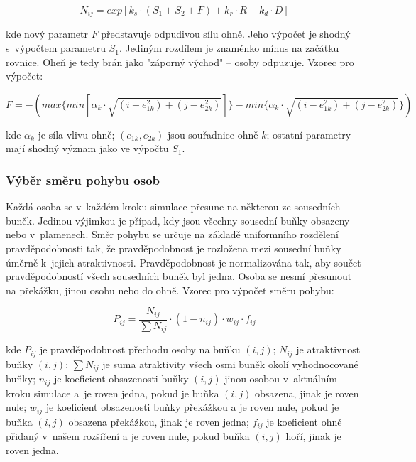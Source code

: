\documentclass[11pt, titlepage, a4paper]{article}
\begin{document}
        \begin{equation}
        \label{eq_NijExt}
        N_{ij} = exp[k_s \cdot (S_1 + S_2 + F) + k_r \cdot R + k_d \cdot D]
        \end{equation}

        kde nový parametr $F$ představuje odpudivou sílu ohně. Jeho výpočet je shodný s~výpočtem parametru $S_1$. Jediným rozdílem je znaménko mínus na začátku rovnice. Oheň je tedy brán jako "záporný východ" -- osoby odpuzuje. Vzorec pro výpočet:

        \begin{equation}
        \label{eq_F}
        F = -(max\{min[\alpha_k \cdot \sqrt{ (i - e_{1k}^2) + (j - e_{2k}^2) }]\} - min\{\alpha_k \cdot \sqrt{ (i - e_{1k}^2) + (j - e_{2k}^2)}\})
        \end{equation}

        kde $\alpha_k$ je síla vlivu ohně; $(e_{1k}, e_{2k})$ jsou souřadnice ohně $k$; ostatní parametry mají shodný význam jako ve výpočtu $S_1$.

        \subsubsection{Výběr směru pohybu osob}
        Každá osoba se v~každém kroku simulace přesune na některou ze sousedních buněk. Jedinou výjimkou je případ, kdy jsou všechny sousední buňky obsazeny nebo v~plamenech. Směr pohybu se určuje na základě uniformního rozdělení pravděpodobnosti tak, že pravděpodobnost je rozložena mezi sousední buňky úměrně k~jejich atraktivnosti. Pravděpodobnost je normalizována tak, aby součet pravděpodobností všech sousedních buněk byl jedna. Osoba se nesmí přesunout na překážku, jinou osobu nebo do ohně. Vzorec pro výpočet směru pohybu:

        \begin{equation}
        \label{eq_Pij}
        P_{ij} = \frac{N_{ij}}{\sum N_{ij}} \cdot (1 - n_{ij}) \cdot w_{ij} \cdot f_{ij}
        \end{equation}

        kde $P_{ij}$ je pravděpodobnost přechodu osoby na buňku $(i,j)$; $N_{ij}$ je atraktivnost buňky $(i,j)$; $\sum N_{ij}$ je suma atraktivity všech osmi buněk okolí vyhodnocované buňky; $n_{ij}$ je koeficient obsazenosti buňky $(i,j)$ jinou osobou v~aktuálním kroku simulace a~je roven jedna, pokud je buňka $(i,j)$ obsazena, jinak je roven nule; $w_{ij}$ je koeficient obsazenosti buňky překážkou a je roven nule, pokud je buňka $(i,j)$ obsazena překážkou, jinak je roven jedna; $f_{ij}$ je koeficient ohně přidaný v~našem rozšíření a je roven nule, pokud buňka $(i,j)$ hoří, jinak je roven jedna.
\end{document}
